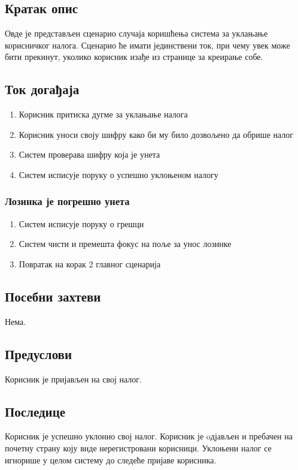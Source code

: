 \subsection{Кратак опис}
Овде је представљен сценарио случаја коришћења система за уклањање корисничког налога. Сценарио ће имати јединствени ток, при чему увек може бити прекинут, уколико корисник изађе из странице за креирање собе.

\subsection{Ток догађаја}
\begin{enumerate}
	\item Корисник притиска дугме за уклањање налога
	\item Корисник уноси своју шифру како би му било дозвољено да обрише налог
	\item Систем проверава шифру која је унета
	\item Систем исписује поруку о успешно уклоњеном налогу
\end{enumerate}

\subsubsection{Лозинка је погрешно унета}
\begin{enumerate}[label=4.\arabic*]
	\item Систем исписује поруку о грешци
	\item Систем чисти и премешта фокус на поље за унос лозинке
	\item Повратак на корак 2 главног сценарија
\end{enumerate}

\subsection{Посебни захтеви}
Нема.

\subsection{Предуслови}
Корисник је пријављен на свој налог.

\subsection{Последице}
Корисник је успешно уклонио свој налог.
Корисник је oдјављен и пребачен на почетну страну коју виде нерегистровани корисници.
Уклоњени налог се игнорише у целом систему до следеће пријаве корисника.
